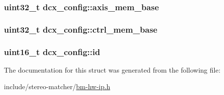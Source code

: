 \subsubsection[{\texorpdfstring{axis\+\_\+mem\+\_\+base}{axis_mem_base}}]{\setlength{\rightskip}{0pt plus 5cm}uint32\+\_\+t dcx\+\_\+config\+::axis\+\_\+mem\+\_\+base}\hypertarget{structdcx__config_a9297308ad57eee72697c41660ccb2b86}{}\label{structdcx__config_a9297308ad57eee72697c41660ccb2b86}
\subsubsection[{\texorpdfstring{ctrl\+\_\+mem\+\_\+base}{ctrl_mem_base}}]{\setlength{\rightskip}{0pt plus 5cm}uint32\+\_\+t dcx\+\_\+config\+::ctrl\+\_\+mem\+\_\+base}\hypertarget{structdcx__config_a75f8a6e408ba2b7a6f68c2171c2107d4}{}\label{structdcx__config_a75f8a6e408ba2b7a6f68c2171c2107d4}
\subsubsection[{\texorpdfstring{id}{id}}]{\setlength{\rightskip}{0pt plus 5cm}uint16\+\_\+t dcx\+\_\+config\+::id}\hypertarget{structdcx__config_a70e359a93971135101d7035d39eeca17}{}\label{structdcx__config_a70e359a93971135101d7035d39eeca17}


The documentation for this struct was generated from the following file\+:\begin{DoxyCompactItemize}
\item 
include/stereo-\/matcher/\hyperlink{bm-hw-ip_8h}{bm-\/hw-\/ip.\+h}\end{DoxyCompactItemize}
